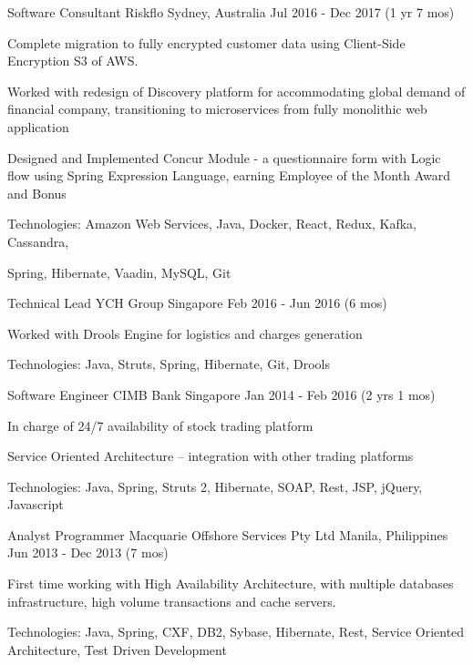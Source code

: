 \begin{cventries}
  \cventry
  {Software Consultant} %
  {Riskflo} %
  {Sydney, Australia} %
  {Jul 2016 - Dec 2017 (1 yr 7 mos)} %
  {
    \begin{cvitems} %
      \item {Complete migration to fully encrypted customer data using Client-Side Encryption S3 of AWS.}
      \item {Worked with redesign of Discovery platform for accommodating global demand of financial company, transitioning to microservices from fully monolithic web application}
      \item {Designed and Implemented Concur Module - a questionnaire form with Logic flow using Spring Expression Language, earning Employee of the Month Award and Bonus}
      \item {Technologies: Amazon Web Services, Java, Docker, React, Redux, Kafka, Cassandra,}
      \item {Spring, Hibernate, Vaadin, MySQL, Git}
    \end{cvitems}
  }

  \cventry
  {Technical Lead} %
  {YCH Group} %
  {Singapore} %
  {Feb 2016 - Jun 2016 (6 mos)} %
  {
    \begin{cvitems} %
      \item {Worked with Drools Engine for logistics and charges generation}
      \item {Technologies: Java, Struts, Spring, Hibernate, Git, Drools}
    \end{cvitems}
  }

  \cventry
  {Software Engineer} %
  {CIMB Bank} %
  {Singapore} %
  {Jan 2014 - Feb 2016 (2 yrs 1 mos)} %
  {
    \begin{cvitems} %
      \item {In charge of 24/7 availability of stock trading platform}
      \item {Service Oriented Architecture – integration with other trading platforms}
      \item {Technologies: Java, Spring, Struts 2, Hibernate, SOAP, Rest, JSP, jQuery, Javascript}
    \end{cvitems}
  }

  \cventry
  {Analyst Programmer} %
  {Macquarie Offshore Services Pty Ltd} %
  {Manila, Philippines} %
  {Jun 2013 - Dec 2013 (7 mos)} %
  {
    \begin{cvitems} %
      \item {First time working with High Availability Architecture, with multiple databases infrastructure, high volume transactions and cache servers.}
      \item {Technologies: Java, Spring, CXF, DB2, Sybase, Hibernate, Rest, Service Oriented Architecture, Test Driven Development}
    \end{cvitems}
  }


\end{cventries}
